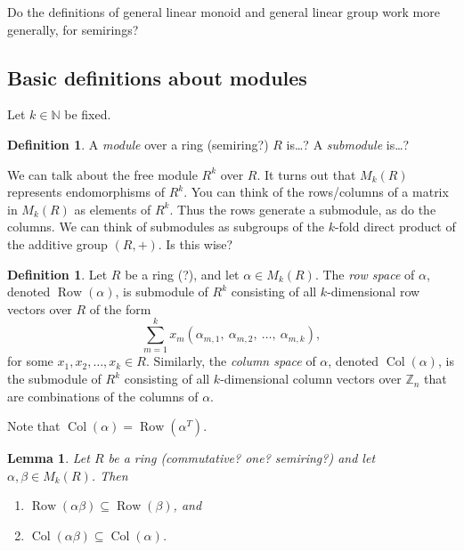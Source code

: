 \documentclass{article}
\newcommand{\N}{\mathbb{N}}
\newcommand{\rowsp}{\operatorname{Row}}
\newcommand{\colsp}{\operatorname{Col}}
\newtheorem{lem}[thm]{Lemma}
\theoremstyle{definition}
\newtheorem{defn}[thm]{Definition}
\begin{document}
{\color{blue}Do the definitions of general linear monoid and general linear
group work more generally, for semirings?}


\subsection{Basic definitions about modules}

Let $k \in \N$ be fixed.

\begin{defn}
  A \emph{module} over a ring (semiring?) $R$ is\ldots?
  A \emph{submodule} is\ldots?
\end{defn}

We can talk about the free module $R^{k}$ over $R$. 
It turns out that $M_{k}(R)$ represents endomorphisms of $R^{k}$.
You can think of the rows/columns of a matrix in $M_{k}(R)$ as elements of
$R^{k}$. Thus the rows generate a submodule, as do the columns.
We can think of submodules as subgroups of the $k$-fold direct product
of the additive group $(R, +)$. Is this wise?

\begin{defn}
  Let $R$ be a ring (?), and let $\alpha \in M_{k}(R)$. The \emph{row space} of
  $\alpha$, denoted $\rowsp(\alpha)$, is submodule of $R^{k}$ consisting of all
  $k$-dimensional row vectors over $R$ of the form
  $$\displaystyle\sum_{m = 1}^{k} x_{m} (\alpha_{m, 1},\ \alpha_{m, 2},\
  \ldots,\ \alpha_{m, k}),$$
  for some $x_{1}, x_{2}, \ldots, x_{k} \in R$.  Similarly, the \emph{column
  space} of $\alpha$, denoted $\colsp(\alpha)$, is the submodule of $R^{k}$
  consisting of all $k$-dimensional column vectors over $\mathbb{Z}_{n}$ that
  are combinations of the columns of $\alpha$.
\end{defn}


Note that $\colsp(\alpha) = \rowsp\left(\alpha^{T}\right)$.

\begin{lem}\label{lem-rowsp-mult}
  Let $R$ be a ring (commutative? one? semiring?)
  and let $\alpha, \beta \in M_{k}(R)$. Then
  \begin{enumerate}
    \item
      $\rowsp(\alpha\beta) \subseteq \rowsp(\beta)$, and
    \item
      $\colsp(\alpha\beta) \subseteq \colsp(\alpha)$.
  \end{enumerate}
\end{lem}
\end{document}
